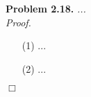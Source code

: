 \documentclass{article}
\begin{document}



\textbf{Problem 2.18.}
\emph{...} \\



\emph{Proof.}
\begin{enumerate}
\item[(1)]
  ...

\item[(2)]
  ...
\end{enumerate}
$\Box$ \\\\



\end{document}
